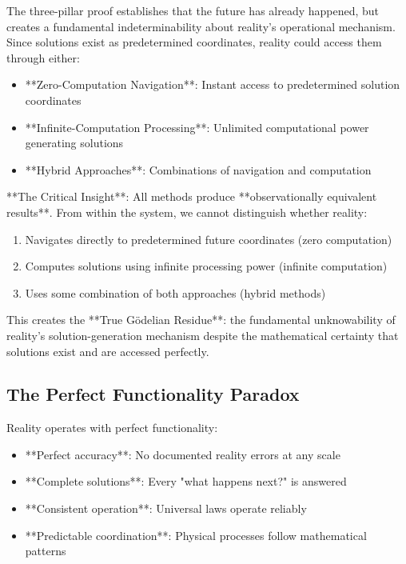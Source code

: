 \documentclass[12pt,a4paper]{article}
\begin{document}
The three-pillar proof establishes that the future has already happened, but creates a fundamental indeterminability about reality's operational mechanism. Since solutions exist as predetermined coordinates, reality could access them through either:

\begin{itemize}
\item **Zero-Computation Navigation**: Instant access to predetermined solution coordinates
\item **Infinite-Computation Processing**: Unlimited computational power generating solutions  
\item **Hybrid Approaches**: Combinations of navigation and computation
\end{itemize}

**The Critical Insight**: All methods produce **observationally equivalent results**. From within the system, we cannot distinguish whether reality:

\begin{enumerate}
\item Navigates directly to predetermined future coordinates (zero computation)
\item Computes solutions using infinite processing power (infinite computation)  
\item Uses some combination of both approaches (hybrid methods)
\end{enumerate}

This creates the **True Gödelian Residue**: the fundamental unknowability of reality's solution-generation mechanism despite the mathematical certainty that solutions exist and are accessed perfectly.

\subsection{The Perfect Functionality Paradox}

Reality operates with perfect functionality:
\begin{itemize}
\item **Perfect accuracy**: No documented reality errors at any scale
\item **Complete solutions**: Every "what happens next?" is answered
\item **Consistent operation**: Universal laws operate reliably
\item **Predictable coordination**: Physical processes follow mathematical patterns
\end{itemize}
\end{document}
